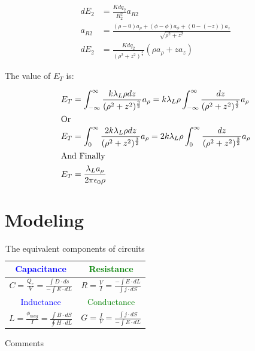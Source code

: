 \documentclass[12pt,letterpaper]{book}
\begin{document}
\begin{align*} 
dE_2&=\frac{Kdq_2}{R_2^2}a_{R2}\\
a_{R2}&=\frac{(\rho -0)a_{\rho }+(\phi -\phi)a_{\phi }+(0-(-z))a_z }{\sqrt{\rho ^2 + z^2}}\\
dE_2&=\frac{Kdq_2}{(\rho ^2 + z^2)^{\frac{3}{2}}} (\rho a_{\rho }+za_z) 
\end{align*}

The value of $E_T$ is:

\begin{align}
E_T&=\int_{-\infty }^{\infty } \frac{ k\lambda _L \rho dz}{(\rho ^2 + z^2)^{\frac{3}{2}}}a_{\rho }=k\lambda _L \rho \int_{-\infty }^{\infty } \frac{ dz}{(\rho ^2 + z^2)^{\frac{3}{2}}}a_{\rho } \\
\intertext{Or}
E_T&=\int_{0 }^{\infty } \frac{2 k\lambda _L \rho dz}{(\rho ^2 + z^2)^{\frac{3}{2}}}a_{\rho }=2k\lambda _L \rho \int_{0}^{\infty } \frac{ dz}{(\rho ^2 + z^2)^{\frac{3}{2}}}a_{\rho } \\
\intertext{And Finally}
E_T&=\frac{\lambda _L a_{\rho }}{2\pi \epsilon _0 \rho }  
\end{align}

\chapter{Modeling}

\begin{table}[H]
        \caption{The equivalent components of circuits}
        \label{DSA}
        \begin{center}
        \begin{tabular}{|c||c|}
        \hline        
         \textcolor{blue}{Capacitance}  &\textcolor{green}{Resistance}   \\ \hline
         $C=\frac{Q_e}{V}=\frac{\int D \cdot ds}{-\int E \cdot dL}  $  
         & $R=\frac{V}{I} = \frac{- \int E \cdot dL}{\int j \cdot dS}$  \\ \hline
         \textcolor{blue}{Inductance}& \textcolor{green}{Conductance} \\ \hline
        $L=\frac{\phi _{mag}}{I}=\frac{\int B \cdot dS}{\oint H\cdot dL}  $  
         & $G=\frac{I}{V}=\frac{\int j\cdot dS}{-\int E\cdot dL}$  \\ \hline
        \end{tabular}
        \end{center}
    \end{table}
    \vspace{0.2 cm}
    Comments
    
\end{document}
